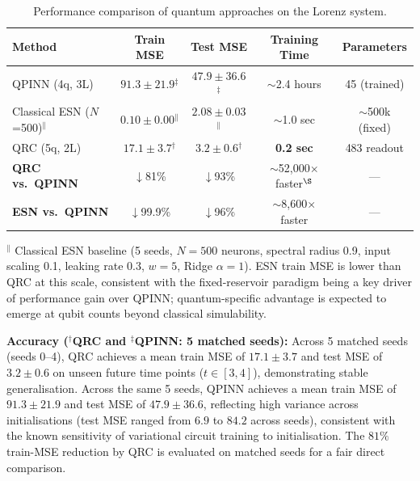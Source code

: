 \documentclass[11pt,a4paper]{article}
\begin{document}
\begin{table}[h]
    \centering
    \caption{Performance comparison of quantum approaches on the Lorenz system.}
    \label{tab:results}
    \begin{tabular}{lcccc}
        \toprule
        \textbf{Method} & \textbf{Train MSE} & \textbf{Test MSE} & \textbf{Training Time} & \textbf{Parameters} \\
        \midrule
        QPINN (4q, 3L) & $91.3 \pm 21.9$$^\ddagger$ & $47.9 \pm 36.6$$^\ddagger$ & ${\sim}$2.4 hours & 45 (trained) \\
        Classical ESN ($N$=500)$^\|$ & $\mathbf{0.10 \pm 0.00}$$^\|$ & $\mathbf{2.08 \pm 0.03}$$^\|$ & ${\sim}$1.0 sec & $\sim$500k (fixed) \\
        QRC (5q, 2L) & $17.1 \pm 3.7$$^\dagger$ & $3.2 \pm 0.6$$^\dagger$ & \textbf{0.2 sec} & 483 readout \\
        \midrule
        \textbf{QRC vs.\ QPINN} & $\downarrow$81\% & $\downarrow$93\% & ${\sim}$52,000$\times$ faster$^\S$ & --- \\
        \textbf{ESN vs.\ QPINN} & $\downarrow$99.9\% & $\downarrow$96\% & ${\sim}$8,600$\times$ faster & --- \\
        \bottomrule
    \end{tabular}
    \smallskip
    \begin{flushleft}
    \small $^\|$ Classical ESN baseline (5 seeds, $N=500$ neurons, spectral radius 0.9, input scaling 0.1, leaking rate 0.3, $w=5$, Ridge $\alpha=1$). ESN train MSE is lower than QRC at this scale, consistent with the fixed-reservoir paradigm being a key driver of performance gain over QPINN; quantum-specific advantage is expected to emerge at qubit counts beyond classical simulability.
    \end{flushleft}
\end{table}

\textbf{Accuracy ($^\dagger$QRC and $^\ddagger$QPINN: 5 matched seeds):}
Across 5 matched seeds (seeds 0--4), QRC achieves a mean train MSE of
$17.1 \pm 3.7$ and test MSE of $3.2 \pm 0.6$ on unseen future time points
($t \in [3,4]$), demonstrating stable generalisation.
Across the same 5 seeds, QPINN achieves a mean train MSE of $91.3 \pm 21.9$ and test
MSE of $47.9 \pm 36.6$, reflecting high variance across initialisations
(test MSE ranged from $6.9$ to $84.2$ across seeds), consistent with
the known sensitivity of variational circuit training to initialisation.
The $81\%$ train-MSE reduction by QRC is evaluated on matched seeds for
a fair direct comparison.
\end{document}
